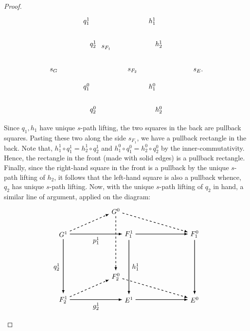 \documentclass[10pt,a4paper]{amsart}
\begin{document}
\begin{proof}
\[\begin{tikzpicture}[scale=1.7]
\node at (1,-0.2) {$q_2^1$};
\node at (1,-2.2) {$q_2^0$};
\node at (-0.2,-1) {$s_G$};
\node at (2.2,-1) {$s_{F_2}$};

\node at (3,-0.2) {$h_2^1$};
\node at (3,-2.2) {$h_2^0$};
\node at (4.2,-1) {$s_E$.};

\node at (0.8,0.5) {$q_1^1$};
\node at (0.8,-1.5) {$q_1^0$};
\node at (2.8,0.5) {$h_1^1$};
\node at (2.8,-1.5) {$h_1^0$};

\node at (1.4,-0.3) {$s_{F_1}$};

\end{tikzpicture}
\] Since $q_1,h_1$ have unique $s$-path lifting, the two squares in the back are pullback squares. Pasting these two along the side $s_{F_1}$, we have a pullback rectangle in the back. Note that, $h_1^1\circ q_1^1=h_2^1\circ q_2^1$ and $h_1^0\circ q_1^0=h_2^0\circ q_2^0$ by the inner-commutativity. Hence, the rectangle in the front (made with solid edges) is a pullback rectangle. Finally, since the right-hand square in the front is a pullback by the unique $s$-path lifting of $h_2$, it follows that the left-hand square is also a pullback whence, $q_2$ has unique $s$-path lifting. Now, with the unique $s$-path lifting of $q_2$ in hand, a similar line of argument, applied on the diagram:
\[
\begin{tikzpicture}[scale=1.7]
\node[] (A1) at (0,0) {$G^1$};
\node[] (A2) at (2,0) {$F_1^1$};
\node[] (A3) at (0,-2) {$F_2^1$};
\node[] (A4) at (2,-2) {$E^1$};

\node[] (B1) at (1.6,0.7) {$G^0$};
\node[] (B2) at (4,0) {$F_1^0$};
\node[] (B3) at (1.6,-1.3) {$F_2^0$};
\node[] (B4) at (4,-2) {$E^0$};

\path[->, black, >=latex,thick] (A1) edge [] node[]{} (A2);
\path[->, black, >=latex,thick] (A3) edge [] node[]{} (A4);
\path[->, black, >=latex,thick] (A1) edge [] node[]{} (A3);
\path[->, black, >=latex,thick] (A2) edge [] node[]{} (A4);

\path[->,black, dashed, >=latex,thick] (B1) edge [] node[]{} (B3);
\path[->,black, >=latex,thick] (A4) edge [] node[]{} (B4);
\path[->,black, >=latex,thick] (A2) edge [] node[]{} (B2);
\path[->,black, >=latex,thick] (B2) edge [] node[]{} (B4);

\path[->,black, dashed, >=latex,thick] (A1) edge [] node {} (B1);
\path[->,black, dashed, >=latex,thick] (A3) edge [] node {} (B3);
\path[->,black, dashed, >=latex,thick] (B1) edge [] node {} (B2);
\path[->,black, dashed, >=latex,thick] (B3) edge [] node {} (B4);

\node at (1,-0.2) {$p_1^1$};
\node at (1,-2.2) {$g_2^1$};
\node at (-0.2,-1) {$q_2^1$};
\node at (2.2,-1) {$h_1^1$};


\end{tikzpicture}\]
\end{proof}
\end{document}
